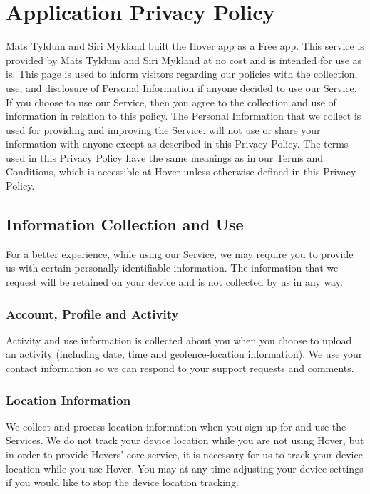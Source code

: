 \section{Application Privacy Policy}
\label{appendix:privacy_policy}
Mats Tyldum and Siri Mykland built the Hover app as a Free app. This service is provided by Mats Tyldum and Siri Mykland at no cost and is intended for use as is. This page is used to inform visitors regarding our policies with the collection, use, and disclosure of Personal Information if anyone decided to use our Service. If you choose to use our Service, then you agree to the collection and use of information in relation to this policy. The Personal Information that we collect is used for providing and improving the Service. will not use or share your information with anyone except as described in this Privacy Policy. The terms used in this Privacy Policy have the same meanings as in our Terms and Conditions, which is accessible at Hover unless otherwise defined in this Privacy Policy.

\subsection*{Information Collection and Use}
For a better experience, while using our Service, we may require you to provide us with certain personally identifiable information. The information that we request will be retained on your device and is not collected by us in any way.

\subsubsection*{Account, Profile and Activity}
Activity and use information is collected about you when you choose to upload an activity (including date, time and geofence-location information). We use your contact information so we can respond to your support requests and comments.

\subsubsection*{Location Information}
We collect and process location information when you sign up for and use the Services. We do not track your device location while you are not using Hover, but in order to provide Hovers' core service, it is necessary for us to track your device location while you use Hover. You may at any time adjusting your device settings if you would like to stop the device location tracking.

